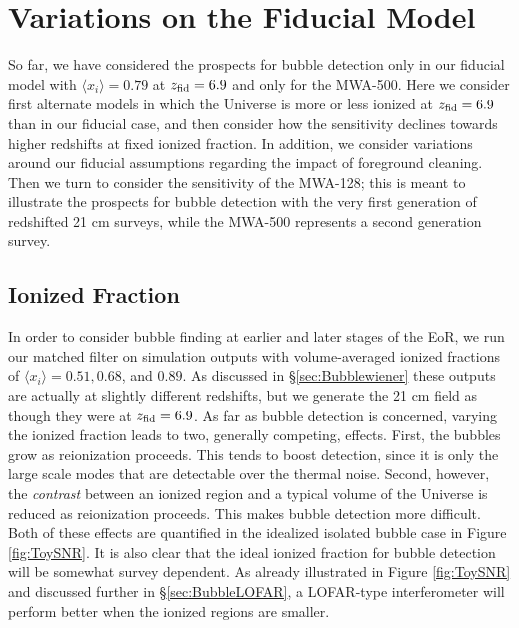 \section{Variations on the Fiducial Model} \label{sec:BubbleVariations}

So far, we have considered the prospects for bubble detection only
in our fiducial model with $\langle x_i \rangle = 0.79$ at $z_{\rm fid} = 6.9$ and
only for the MWA-500. Here we consider first alternate models in
which the Universe is more or less ionized at $z_{\rm fid} = 6.9$ than in our
fiducial case, and then consider how the sensitivity declines towards
higher redshifts at fixed ionized fraction. In addition, we consider variations
around our fiducial assumptions regarding the impact of foreground cleaning.
Then we turn to consider
the sensitivity of the MWA-128; this is meant to illustrate the
prospects for bubble detection with the very first generation of redshifted
21 cm surveys, while the MWA-500 represents a second generation survey.



\subsection{Ionized Fraction} \label{sec:BubbleVaryXi}

In order to consider bubble finding at earlier and later stages of the
EoR, we run our matched filter on simulation outputs with volume-averaged 
ionized fractions of $\langle x_i \rangle = 0.51, 0.68$, and $0.89$. As discussed in
\S\ref{sec:Bubblewiener} these outputs are actually at slightly different redshifts,
but we generate the 21 cm field as though they were at $z_{\rm fid} = 6.9$.
As far as bubble detection is concerned, varying the ionized fraction leads
to two, generally competing, effects. First, the bubbles grow as reionization
proceeds. This tends to boost detection, since it is only the large
scale modes that are detectable over the thermal noise. Second, however,
the {\em contrast} between an ionized region and a typical volume
of the Universe is reduced as reionization proceeds. This makes bubble
detection more difficult. Both of these effects are quantified in
the idealized isolated bubble case in Figure \ref{fig:ToySNR}.
It is also clear that the ideal ionized fraction for bubble detection
will be somewhat survey dependent. As already illustrated in
Figure \ref{fig:ToySNR} and discussed further in \S \ref{sec:BubbleLOFAR},
a LOFAR-type interferometer will perform better when the ionized
regions are smaller. 

